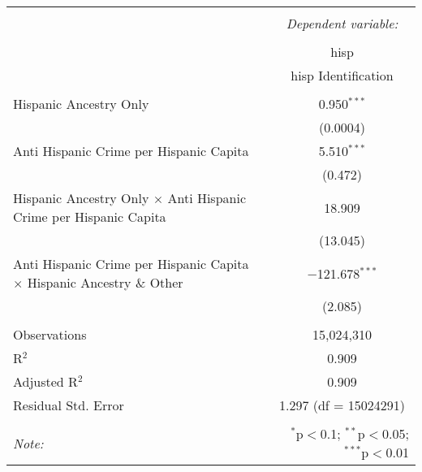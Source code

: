 \documentclass{article}
\begin{document}
    \begin{table}[!htbp] \centering 
      \caption{} 
      \label{} 
    \begin{tabular}{@{\extracolsep{5pt}}lc} 
    \\[-1.8ex]\hline 
    \hline \\[-1.8ex] 
     & \multicolumn{1}{c}{\textit{Dependent variable:}} \\ 
    \cline{2-2} 
    \\[-1.8ex] & hisp \\ 
     & hisp Identification \\ 
    \hline \\[-1.8ex] 
     Hispanic Ancestry Only & 0.950$^{***}$ \\ 
      & (0.0004) \\ 
     Anti Hispanic Crime per Hispanic Capita  & 5.510$^{***}$ \\ 
      & (0.472) \\ 
     Hispanic Ancestry Only $\times$ Anti Hispanic Crime per Hispanic Capita  & 18.909 \\ 
      & (13.045) \\ 
     Anti Hispanic Crime per Hispanic Capita $\times$ Hispanic Ancestry \& Other & $-$121.678$^{***}$ \\ 
      & (2.085) \\ 
    \hline \\[-1.8ex] 
    Observations & 15,024,310 \\ 
    R$^{2}$ & 0.909 \\ 
    Adjusted R$^{2}$ & 0.909 \\ 
    Residual Std. Error & 1.297 (df = 15024291) \\ 
    \hline 
    \hline \\[-1.8ex] 
    \textit{Note:}  & \multicolumn{1}{r}{$^{*}$p$<$0.1; $^{**}$p$<$0.05; $^{***}$p$<$0.01} \\ 
    \end{tabular} 
    \end{table} 
\end{document}
